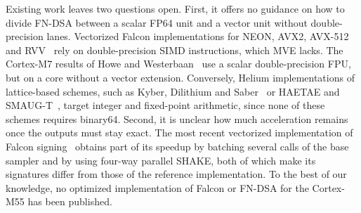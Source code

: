 Existing work leaves two questions open.
First, it offers no guidance on how to divide FN-DSA between a scalar FP64
unit and a vector unit without double-precision lanes.
Vectorized Falcon implementations for NEON, AVX2, AVX-512 and
RVV~\cite{KSS22,NG23,ZZ26} rely on double-precision SIMD instructions, which
MVE lacks.
The Cortex-M7 results of Howe and Westerbaan~\cite{HW23} use a scalar
double-precision FPU, but on a core without a vector extension.
Conversely, Helium implementations of lattice-based schemes, such as Kyber,
Dilithium and Saber~\cite{BMKYV22,SLOTHY} or HAETAE and
SMAUG-T~\cite{LSS26}, target integer and fixed-point arithmetic, since none
of these schemes requires binary64.
Second, it is unclear how much acceleration remains once the outputs must
stay exact.
The most recent vectorized implementation of Falcon signing~\cite{ZZ26}
obtains part of its speedup by batching several calls of the base sampler
and by using four-way parallel SHAKE, both of which make its signatures
differ from those of the reference implementation.
To the best of our knowledge, no optimized implementation of Falcon or FN-DSA
for the Cortex-M55 has been published.

